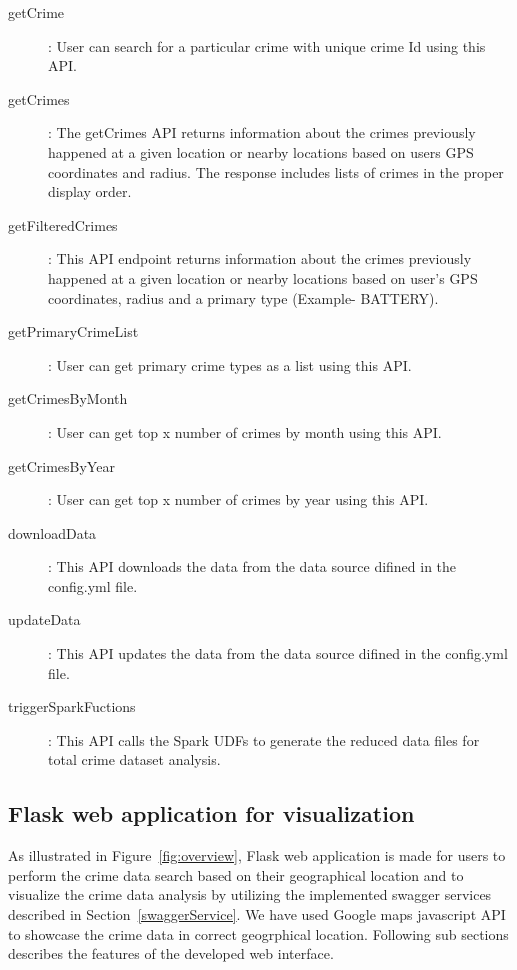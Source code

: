 \begin{description}
	\item[getCrime]: User can search for a particular crime with
	unique crime Id using this API.
        \item[getCrimes]: The
	getCrimes API returns information about the crimes previously
	happened at a given location or nearby locations based on
	users GPS coordinates and radius. The response includes lists
	of crimes in the proper display
	order.
        \item[getFilteredCrimes]: This API endpoint returns
	information about the crimes previously happened at a given
	location or nearby locations based on user’s GPS coordinates,
	radius and a primary type (Example-
	BATTERY).
        \item[getPrimaryCrimeList]: User can get primary
	crime types as a list using this
	API.
        \item[getCrimesByMonth]: User can get top x number of
	crimes by month using this API.
        \item[getCrimesByYear]: User
	can get top x number of crimes by year using this
	API.
        \item[downloadData]: This API downloads the data from
	the data source difined in the config.yml
	file.
        \item[updateData]: This API updates the data from the
	data source difined in the config.yml
	file.
        \item[triggerSparkFuctions]: This API calls the Spark
	UDFs to generate the reduced data files for total crime
	dataset analysis.
\end{description}

\subsection{Flask web application for visualization}\label{flaskWebApp}
As illustrated in Figure~\ref{fig:overview}, Flask web application is
made for users to perform the crime data search based on their
geographical location and to visualize the crime data analysis by
utilizing the implemented swagger services described in
Section~\ref{swaggerService}. We have used Google maps javascript API
to showcase the crime data in correct geogrphical location. Following
sub sections describes the features of the developed web interface.

